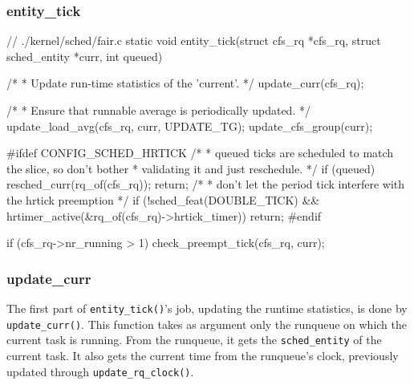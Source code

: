 \subsubsection{entity\_tick}
\begin{code}
// ./kernel/sched/fair.c
static void
entity_tick(struct cfs_rq *cfs_rq, struct sched_entity *curr, int queued)
{
	/*
	 * Update run-time statistics of the 'current'.
	 */
	update_curr(cfs_rq);

	/*
	 * Ensure that runnable average is periodically updated.
	 */
	update_load_avg(cfs_rq, curr, UPDATE_TG);
	update_cfs_group(curr);

#ifdef CONFIG_SCHED_HRTICK
	/*
	 * queued ticks are scheduled to match the slice, so don't bother
	 * validating it and just reschedule.
	 */
	if (queued) {
		resched_curr(rq_of(cfs_rq));
		return;
	}
	/*
	 * don't let the period tick interfere with the hrtick preemption
	 */
	if (!sched_feat(DOUBLE_TICK) &&
			hrtimer_active(&rq_of(cfs_rq)->hrtick_timer))
		return;
#endif

	if (cfs_rq->nr_running > 1)
		check_preempt_tick(cfs_rq, curr);
}
\end{code}
\subsubsection{update\_curr}
\label{sec:update_curr}

The first part of \verb|entity_tick()|'s job, updating the runtime statistics, is done by \verb|update_curr()|. This function takes as argument only the runqueue on which the current task is running. From the runqueue, it gets the \verb|sched_entity| of the current task. It also gets the current time from the runqueue's clock, previously updated through \verb|update_rq_clock()|.

